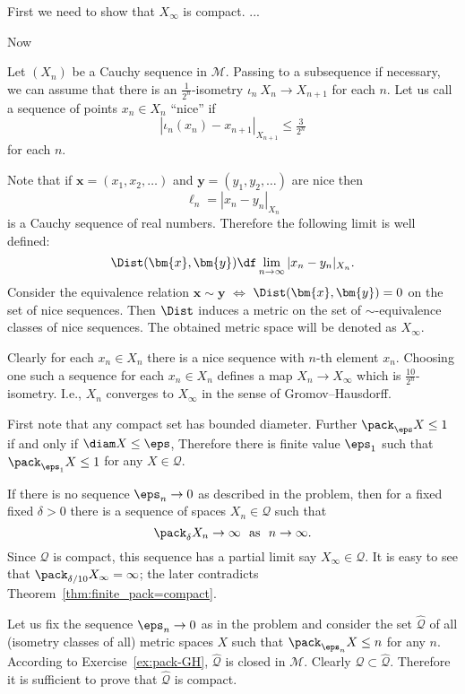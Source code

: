 First we need to show that $X_\infty$ is compact.
...

Now 
\qeds

Let $(X_n)$ be a Cauchy sequence in $\mathcal{M}$.
Passing to a subsequence if necessary, we can assume that there is an 
$\tfrac1{2^n}$-isometry $\iota_n\: X_n\to X_{n+1}$ for each $n$.
Let us call a sequence of points $x_n\in X_n$ ``nice'' if 
$$|\iota_n(x_n) - x_{n+1}|_{X_{n+1}}\le \tfrac3{2^{n}}$$ 
for each $n$.

Note that if $\bm{x}=(x_1,x_2,\dots)$ and $\bm{y}=(y_1,y_2,\dots)$ are nice 
then 
$$\ell_n=|x_n-y_n|_{X_n}$$ 
is a Cauchy sequence of real numbers.
Therefore the following limit is well defined:
$$\Dist(\bm{x},\bm{y})\df\lim_{n\to\infty}|x_n-y_n|_{X_n}.$$ 
Consider the equivalence relation 
$\bm{x}\sim\bm{y}$ $\Leftrightarrow$ $\Dist(\bm{x},\bm{y})=0$ on the set of nice sequences.
Then $\Dist$ induces a metric on the set of $\sim$-equivalence classes of nice sequences.
The obtained metric space will be denoted as $X_\infty$.

Clearly for each $x_n\in X_n$ there is a nice sequence with $n$-th element $x_n$.
Choosing one such a sequence for each $x_n\in X_n$ defines a map $X_n\to X_\infty$ which is $\tfrac{10}{2^n}$-isometry.
I.e., $X_n$ converges to $X_\infty$ in the sense of Gromov--Hausdorff.
\qeds

First note that any compact set has bounded diameter.
Further $\pack_\eps X\le 1$ if and only if $\diam X\le \eps$,
Therefore there is finite value $\eps_1$ such that $\pack_{\eps_1} X\le 1$ for any $X\in\mathcal{Q}$.

If there is no sequence $\eps_n\to0$ as described in the problem, then for a fixed fixed $\delta>0$
there is a sequence of spaces $X_n\in\mathcal{Q}$ such that $$\pack_\delta X_n\to\infty\ \ \text{as}\ \  n\to\infty.$$
Since $\mathcal{Q}$ is compact, 
this sequence has a partial limit say $X_\infty\in\mathcal{Q}$.
It is easy to see that $\pack_{\delta/10} X_\infty=\infty$;
the later contradicts Theorem~\ref{thm:finite_pack=compact}.

Let us fix the sequence $\eps_n\to 0$ as in the problem and consider the set $\hat{\mathcal{Q}}$ of all (isometry classes of all) metric spaces $X$ such that
$\pack_{\eps_n} X\le n$ for any $n$. 
According to Exercise~\ref{ex:pack-GH}, $\hat{\mathcal{Q}}$ is closed in $\mathcal{M}$.
Clearly $\mathcal{Q}\subset\hat{\mathcal{Q}}$.
Therefore it is sufficient to prove that $\hat{\mathcal{Q}}$ is compact.

